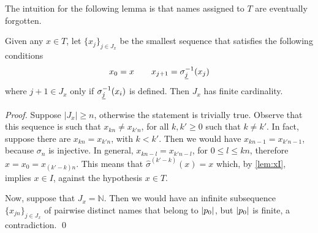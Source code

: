 The intuition for the following lemma is that names assigned to $T$ are eventually forgotten.

\begin{lemma}
\label{lem:rho-forget}
Given any $x \in T$, let $\{x_j\}_{j \in J_x}$ be the smallest sequence that satisfies the following conditions
\[
	x_0 = x \qquad
	x_{j+1} = \sigma_{{\underline{j}}}^{-1}(x_j)
\]
where $j+1 \in J_x$ only if $\sigma_{{\underline{j}}}^{-1}(x_i)$ is defined. Then $J_x$ has finite cardinality.

\end{lemma}
\begin{proof}
Suppose $|J_x| \geq n$, otherwise the statement is trivially true. Observe that this sequence is such that $x_{kn} \neq x_{k'n}$, for all $k,k' \geq 0$ such that $k \neq k'$. In fact, suppose there are $x_{kn} = x_{k'n}$, with $k < k'$. Then we would have $x_{kn-1} = x_{k'n-1}$, because $\sigma_{n}$ is injective. In general, $x_{kn-l} = x_{k'n-l}$, for $0 \leq l \leq kn$, therefore $x = x_0 = x_{(k'-k)n}$. This means that $\widehat{\sigma}^{(k'-k)}(x) = x$ which, by \cref{lem:xI}, implies $x \in I$, against the hypothesis $x \in T$.

Now, suppose that $J_x = \mathbb{N}$. Then we would have an infinite subsequence $\{x_{jn}\}_{j \in J_x}$ of pairwise distinct names that belong to $|p_0|$, but $|p_0|$ is finite, a contradiction.
\qed
\end{proof}
%



